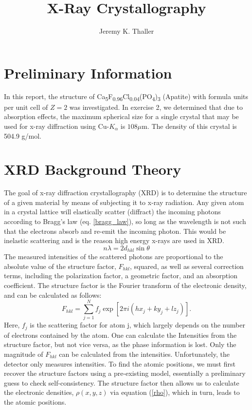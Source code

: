 \documentclass[]{scrartcl}
\title{X-Ray Crystallography}
\author{Jeremy K. Thaller}
\begin{document}
\maketitle

\begin{abstract}

\end{abstract}


\section{Preliminary Information}
In this report, the structure of Ca\textsubscript{5}F\textsubscript{0.96}Cl\textsubscript{0.04}(PO\textsubscript{4})\textsubscript{3} (Apatite) with formula units per unit cell of $Z=2$ was investigated. In exercise 2, we determined that due to absorption effects, the maximum spherical size for a single crystal that may be used for x-ray diffraction using Cu-$ K_\alpha $ is $ 108\mu $m. The density of this crystal is 504.9 g/mol.


\section{XRD Background Theory}
The goal of x-ray diffraction crystallography (XRD) is to determine the structure of a given material by means of subjecting it to x-ray radiation. Any given atom in a crystal lattice will elastically scatter (diffract) the incoming photons according to Bragg's law (eq. \ref{bragg_law}), so long as the wavelength is not such that the electrons absorb and re-emit the incoming photon. This would be inelastic scattering and is the reason high energy x-rays are used in XRD.
\begin{equation}\label{bragg_law}
n\lambda = 2d_{hkl}\sin{\theta}
\end{equation}
The measured intensities of the scattered photons are proportional to the absolute value of the structure factor, $ F_{hkl} $, squared, as well as several correction terms, including the polarization factor, a geometric factor, and an absorption coefficient. The structure factor is the Fourier transform of the electronic density, and can be calculated as follows:
\begin{equation}
\label{struct_fact}
F_{hkl} = \sum_{j=1}^{N} f_j \exp[2\pi i(hx_j+ky_j+lz_j)]\textrm{.}
\end{equation}
Here, $ f_j $ is the scattering factor for atom j, which largely depends on the number of electrons contained by the atom. One can calculate the Intensities from the structure factor, but not vice versa, as the phase information is lost. Only the magnitude of $ F_{hkl} $ can be calculated from the intensities. Unfortunately, the detector only measures intensities. To find the atomic positions, we must first recover the structure factors using a pre-existing model, essentially a preliminary guess to check self-consistency. The structure factor then allows us to calculate the electronic densities, $ \rho(x,y,z) $ via equation (\ref{rho}), which in turn, leads to the atomic positions.
\end{document}
